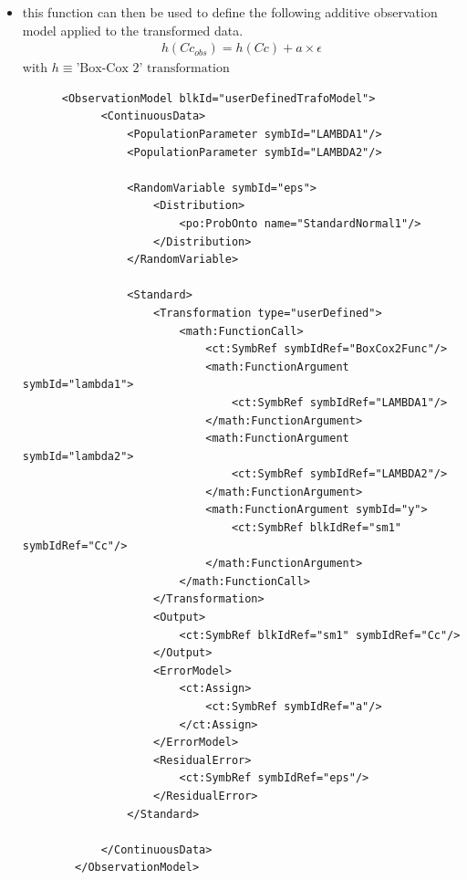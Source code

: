 \begin{itemize}
\item
this function can then be used to define the following additive observation model
applied to the transformed data.
\begin{align}
h(Cc_{obs}) = h(Cc) + a \times \epsilon \nonumber
\end{align}
with $h \equiv \text{'Box-Cox 2' transformation}$

\lstset{language=XML}
\begin{lstlisting}
      <ObservationModel blkId="userDefinedTrafoModel">
            <ContinuousData>
                <PopulationParameter symbId="LAMBDA1"/>
                <PopulationParameter symbId="LAMBDA2"/>

                <RandomVariable symbId="eps">
                    <Distribution>
                        <po:ProbOnto name="StandardNormal1"/>
                    </Distribution>
                </RandomVariable>
                
                <Standard>
                    <Transformation type="userDefined">
                        <math:FunctionCall>
                            <ct:SymbRef symbIdRef="BoxCox2Func"/>
                            <math:FunctionArgument symbId="lambda1">
                                <ct:SymbRef symbIdRef="LAMBDA1"/>
                            </math:FunctionArgument>
                            <math:FunctionArgument symbId="lambda2">
                                <ct:SymbRef symbIdRef="LAMBDA2"/>
                            </math:FunctionArgument>
                            <math:FunctionArgument symbId="y">
                                <ct:SymbRef blkIdRef="sm1" symbIdRef="Cc"/>
                            </math:FunctionArgument>
                        </math:FunctionCall>
                    </Transformation>
                    <Output>
                        <ct:SymbRef blkIdRef="sm1" symbIdRef="Cc"/>
                    </Output>
                    <ErrorModel>
                        <ct:Assign>
                            <ct:SymbRef symbIdRef="a"/>
                        </ct:Assign>
                    </ErrorModel>
                    <ResidualError>
                        <ct:SymbRef symbIdRef="eps"/>
                    </ResidualError>
                </Standard>
                
            </ContinuousData>
        </ObservationModel>
\end{lstlisting}

\end{itemize}


